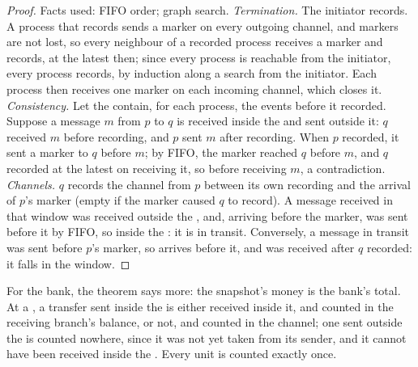 \begin{proof}
Facts used: FIFO order; graph search. \emph{Termination.} The initiator records. A process that records sends a marker on every outgoing channel, and markers are not lost, so every neighbour of a recorded process receives a marker and records, at the latest then; since every process is reachable from the initiator, every process records, by induction along a search from the initiator. Each process then receives one marker on each incoming channel, which closes it. \emph{Consistency.} Let the  contain, for each process, the events before it recorded. Suppose a message $m$ from $p$ to $q$ is received inside the  and sent outside it: $q$ received $m$ before recording, and $p$ sent $m$ after recording. When $p$ recorded, it sent a marker to $q$ before $m$; by FIFO, the marker reached $q$ before $m$, and $q$ recorded at the latest on receiving it, so before receiving $m$, a contradiction. \emph{Channels.} $q$ records the channel from $p$ between its own recording and the arrival of $p$'s marker (empty if the marker caused $q$ to record). A message received in that window was received outside the , and, arriving before the marker, was sent before it by FIFO, so inside the : it is in transit. Conversely, a message in transit was sent before $p$'s marker, so arrives before it, and was received after $q$ recorded: it falls in the window.
\end{proof}

For the bank, the theorem says more: the snapshot's money is the bank's total. At a , a transfer sent inside the  is either received inside it, and counted in the receiving branch's balance, or not, and counted in the channel; one sent outside the  is counted nowhere, since it was not yet taken from its sender, and it cannot have been received inside the . Every unit is counted exactly once.


